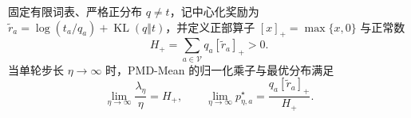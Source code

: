 \documentclass[lang=cn,scheme=chinese,openany]{elegantbook}
\newcommand{\KL}{\operatorname{KL}}
\begin{document}
\begin{proposition}
\label{dyn:prop:mean-opd-large-eta}
\label{prop:ch2-opd-pmd-mean-infinity}
固定有限词表、严格正分布 $q\ne t$，记中心化奖励为 $\widetilde r_a=\log(t_a/q_a)+\KL(q\Vert t)$，并定义正部算子 $[x]_+=\max\{x,0\}$ 与正常数
\begin{equation*}
 H_+=\sum_{a\in\mathcal V} q_a[\widetilde r_a]_+>0.
\end{equation*}
当单轮步长 $\eta\to\infty$ 时，PMD-Mean 的归一化乘子与最优分布满足
\begin{equation}
 \lim_{\eta\to\infty}\frac{\lambda_\eta}{\eta}= H_+,
 \qquad
 \lim_{\eta\to\infty}p_{\eta,a}^\star=\frac{q_a[\widetilde r_a]_+}{H_+}.
 \label{dyn:eq:mean-opd-large-eta,eq:ch2-opd-pmd-mean-infinity-target}
\end{equation}
\end{proposition}
\end{document}
